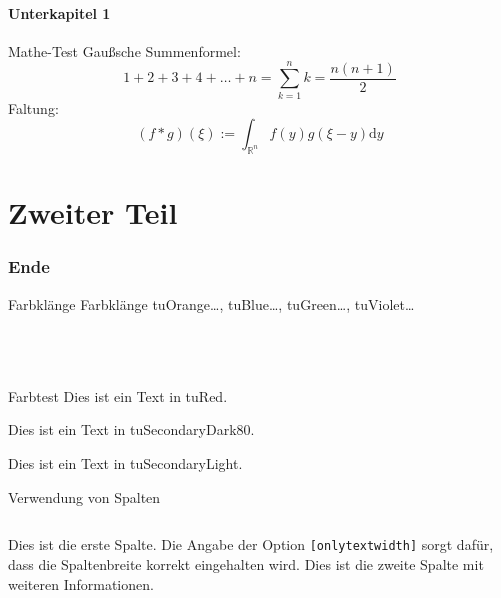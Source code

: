 \documentclass[fleqn,11pt]{beamer}
\begin{document}
\subsection{Unterkapitel 1}


\begin{frame}{Mathe-Test}
  Gaußsche Summenformel:
  \[1 + 2 + 3 + 4 + \ldots + n = \sum_{k=1}^n k = \frac{n(n+1)}{2}\]
  Faltung:
  \[(f*g)(\xi) := \int_{\mathbb{R}^n} f(y)g(\xi-y)\mathrm{d}y\]
\end{frame}


\part{Zweiter Teil}


\begin{frame}
  \partpage
\end{frame}


\section{Ende}


\begin{frame}{Farbklänge}\small
  Farbklänge tuOrange\ldots, tuBlue\ldots, tuGreen\ldots, tuViolet\ldots\\\tiny
  ~\\
  ~\\
  ~\\
\end{frame}


\begin{frame}{Farbtest}
  \color{tuRed}
  Dies ist ein Text in tuRed.

  \color{tuSecondaryDark80}
  Dies ist ein Text in tuSecondaryDark80.

  \color{tuSecondaryLight}
  Dies ist ein Text in tuSecondaryLight.
\end{frame}


\begin{frame}{Verwendung von Spalten}
  \begin{columns}[onlytextwidth]
      Dies ist die erste Spalte.
      Die Angabe der Option \texttt{[onlytextwidth]}
      sorgt dafür, dass die Spaltenbreite korrekt eingehalten wird.
      Dies ist die zweite Spalte mit weiteren Informationen.
  \end{columns}
\end{frame}
\end{document}
